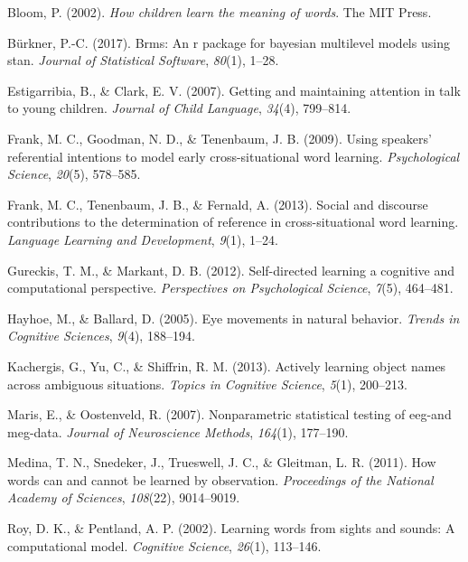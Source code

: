 \documentclass[10pt, letterpaper]{article}
\begin{document}
\leavevmode\hypertarget{ref-bloom2002children}{}%
Bloom, P. (2002). \emph{How children learn the meaning of words}. The
MIT Press.

\leavevmode\hypertarget{ref-burkner2017brms}{}%
Bürkner, P.-C. (2017). Brms: An r package for bayesian multilevel models
using stan. \emph{Journal of Statistical Software}, \emph{80}(1), 1--28.

\leavevmode\hypertarget{ref-estigarribia2007getting}{}%
Estigarribia, B., \& Clark, E. V. (2007). Getting and maintaining
attention in talk to young children. \emph{Journal of Child Language},
\emph{34}(4), 799--814.

\leavevmode\hypertarget{ref-frank2009using}{}%
Frank, M. C., Goodman, N. D., \& Tenenbaum, J. B. (2009). Using
speakers' referential intentions to model early cross-situational word
learning. \emph{Psychological Science}, \emph{20}(5), 578--585.

\leavevmode\hypertarget{ref-frank2013social}{}%
Frank, M. C., Tenenbaum, J. B., \& Fernald, A. (2013). Social and
discourse contributions to the determination of reference in
cross-situational word learning. \emph{Language Learning and
Development}, \emph{9}(1), 1--24.

\leavevmode\hypertarget{ref-gureckis2012self}{}%
Gureckis, T. M., \& Markant, D. B. (2012). Self-directed learning a
cognitive and computational perspective. \emph{Perspectives on
Psychological Science}, \emph{7}(5), 464--481.

\leavevmode\hypertarget{ref-hayhoe2005eye}{}%
Hayhoe, M., \& Ballard, D. (2005). Eye movements in natural behavior.
\emph{Trends in Cognitive Sciences}, \emph{9}(4), 188--194.

\leavevmode\hypertarget{ref-kachergis2013actively}{}%
Kachergis, G., Yu, C., \& Shiffrin, R. M. (2013). Actively learning
object names across ambiguous situations. \emph{Topics in Cognitive
Science}, \emph{5}(1), 200--213.

\leavevmode\hypertarget{ref-maris2007nonparametric}{}%
Maris, E., \& Oostenveld, R. (2007). Nonparametric statistical testing
of eeg-and meg-data. \emph{Journal of Neuroscience Methods},
\emph{164}(1), 177--190.

\leavevmode\hypertarget{ref-medina2011words}{}%
Medina, T. N., Snedeker, J., Trueswell, J. C., \& Gleitman, L. R.
(2011). How words can and cannot be learned by observation.
\emph{Proceedings of the National Academy of Sciences}, \emph{108}(22),
9014--9019.

\leavevmode\hypertarget{ref-roy2002learning}{}%
Roy, D. K., \& Pentland, A. P. (2002). Learning words from sights and
sounds: A computational model. \emph{Cognitive Science}, \emph{26}(1),
113--146.
\end{document}
